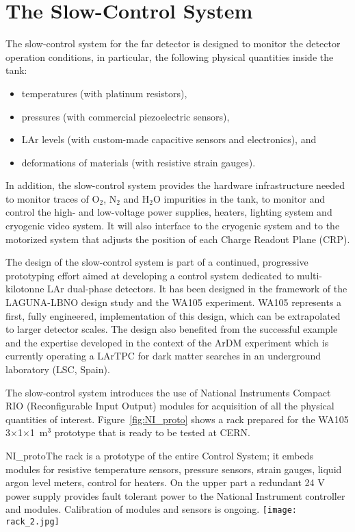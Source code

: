 \section{The Slow-Control System} 
\label{sec:detectors-fd-alt-dcs}

The slow-control system for the far detector is designed  to
monitor the detector operation conditions, in particular, the following physical
quantities inside the tank:
\begin{itemize}
 \item temperatures (with platinum resistors),
 \item pressures (with commercial piezoelectric sensors),
 \item LAr levels (with custom-made capacitive sensors and electronics), and
 \item deformations of materials (with resistive strain gauges).
\end{itemize} 

In addition, the slow-control system provides the hardware
infrastructure needed to monitor traces of O$_2$, N$_2$ and H$_2$O
impurities in the tank, to monitor and control the high- and
low-voltage power supplies, heaters, lighting system and cryogenic
video system. It will also interface to the cryogenic system and to
the motorized system that adjusts the position of each Charge Readout
Plane (CRP).


The design of the slow-control system is part of a
continued, progressive prototyping effort aimed at developing a
control system dedicated to multi-kilotonne LAr dual-phase detectors. It
has been designed in the framework of the LAGUNA-LBNO design study and
 the WA105 experiment. WA105 represents a first, fully engineered,
implementation of this design, which can be extrapolated to larger
detector scales. The design also benefited from the successful example
and the expertise developed in the context of the ArDM
experiment\cite{Badertscher:2013ygt} which is currently operating a
LArTPC for dark matter searches in an underground laboratory (LSC,
Spain).

The slow-control system introduces the use of National Instruments
Compact RIO (Reconfigurable Input Output) modules for acquisition of
all the physical quantities of interest.  Figure~\ref{fig:NI_proto}
shows a rack prepared for the WA105 3$\times$1$\times$1~m$^3$
prototype that is ready to be tested at CERN.
\begin{cdrfigure}{NI_proto}{The rack is a  prototype of the entire Control System; it  embeds modules for resistive 
temperature sensors, pressure  sensors, strain gauges, liquid argon level  meters, control for  heaters. On the upper part a redundant 24 V power supply 
provides fault tolerant power to the National Instrument controller and modules.  Calibration of modules and sensors is ongoing.}
\texttt{[image: rack\_2.jpg]}
\end{cdrfigure}


